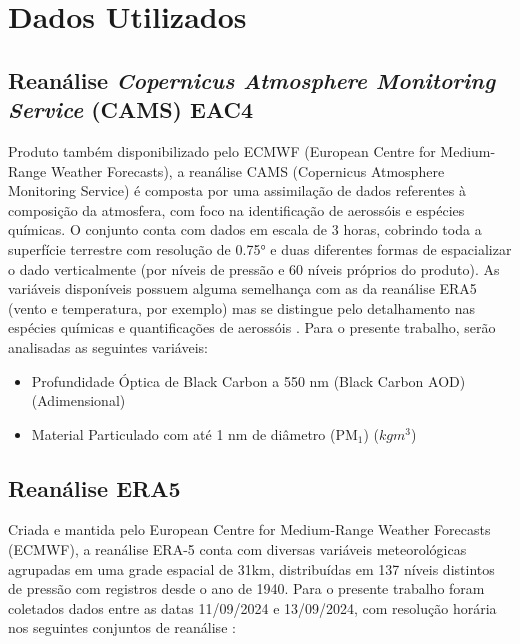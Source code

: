 \section{Dados Utilizados}
\subsection{Reanálise \textit{Copernicus Atmosphere Monitoring Service} (CAMS) EAC4}

	Produto também disponibilizado pelo ECMWF (European Centre for Medium-Range Weather Forecasts), a reanálise CAMS (Copernicus Atmosphere Monitoring Service) é composta por uma assimilação de dados referentes à composição da atmosfera, com foco na identificação de aerossóis e espécies químicas. O conjunto conta com dados em escala de 3 horas, cobrindo toda a superfície terrestre com resolução de 0.75° e duas diferentes formas de espacializar o dado verticalmente (por níveis de pressão e 60 níveis próprios do produto). As variáveis disponíveis possuem alguma semelhança com as da reanálise ERA5 (vento e temperatura, por exemplo) mas se distingue pelo detalhamento nas espécies químicas e quantificações de aerossóis \autocite{inness2019}. Para o presente trabalho, serão analisadas as seguintes variáveis:
	\begin{itemize}
		\item Profundidade Óptica de Black Carbon a 550 nm (Black Carbon AOD) (Adimensional)
		\item Material Particulado com até 1 nm de diâmetro (PM$_{1}$) ($kgm^{3}$)
		
	\end{itemize}

\subsection{Reanálise ERA5}

	Criada e mantida pelo European Centre for Medium-Range Weather Forecasts (ECMWF), a reanálise ERA-5 conta com diversas variáveis meteorológicas agrupadas em uma grade espacial de 31km, distribuídas em 137 níveis distintos de pressão com registros desde o ano de 1940. Para o presente trabalho foram coletados dados entre as datas 11/09/2024 e 13/09/2024, com resolução horária nos seguintes conjuntos de reanálise \autocite{hersbach2020}:
	
